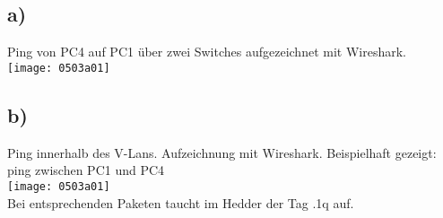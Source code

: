 \documentclass{article}
\begin{document}
	\subsection*{a)}
	Ping von PC4 auf PC1 über zwei Switches aufgezeichnet mit Wireshark. \\
	\texttt{[image: 0503a01]}
	\subsection*{b)}
	Ping innerhalb des V-Lans. Aufzeichnung mit Wireshark. Beispielhaft gezeigt: ping zwischen PC1 und PC4 \\
	\texttt{[image: 0503a01]} \\
	Bei entsprechenden Paketen taucht im Hedder der Tag .1q auf.
\end{document}
